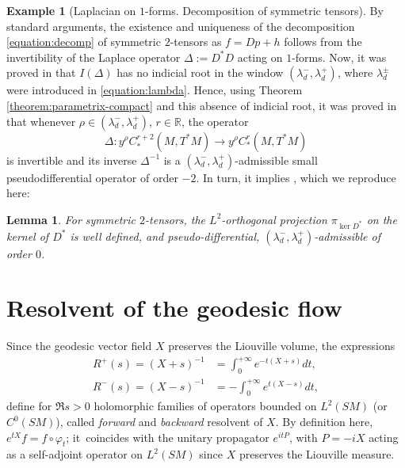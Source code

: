 \documentclass[JEP,XML,SOM,Unicode,NoFloatCountersInSection]{cedram}
\newcommand{\R}{\mathbb{R}}
\theoremstyle{plain}
\newtheorem{lemma}{Lemma}[section]
\theoremstyle{definition}
\newtheorem{example}{Example}[section]
\begin{document}
\begin{example}[Laplacian on $1$-forms. Decomposition of symmetric tensors]
\label{example:dec}
By standard arguments, the existence and uniqueness of the decomposition \eqref{equation:decomp} of symmetric $2$-tensors as $f = Dp + h$ follows from the invertibility of the Laplace operator $\Delta := D^*D$ acting on $1$-forms. Now, it was proved in \cite[Lem.\,5.4]{Bonthonneau-Lefeuvre-19-1} that $I(\Delta)$ has no indicial root in the window $(\lambda_d^-, \lambda_d^+)$, where $\lambda_d^\pm$ were introduced in \eqref{equation:lambda}. Hence, using Theorem \ref{theorem:parametrix-compact} and this absence of indicial root, it was proved in \cite[Lem.\,5.4]{Bonthonneau-Lefeuvre-19-1} that whenever $\rho \in (\lambda_d^-, \lambda_d^+)$, $r \in \R$, the operator
\[
\Delta : y^\rho C^{r+2}_*(M,T^*M) \to y^\rho C^r_*(M,T^*M)
\]
is invertible and its inverse $\Delta^{-1}$ is a $(\lambda_d^-,\lambda_d^+)$-admissible small pseudodifferential operator of order $-2$. In turn, it implies \cite[Lem.\,5.5]{Bonthonneau-Lefeuvre-19-1}, which we reproduce here:
\begin{lemma}
\label{lemma:proj-ker-D^ast-admissible}
For symmetric $2$-tensors, the $L^2$-orthogonal projection $\pi_{\ker D^\ast}$ on the kernel of $D^\ast$ is well defined, and pseudo-differential, $(\lambda_d^-, \lambda_d^+)$-admissible of order $0$.
\end{lemma}
\end{example}

\section{Resolvent of the geodesic flow}
\label{sec:resolvent}

Since the geodesic vector field $X$ preserves the Liouville volume, the expressions
\begin{equation}
\label{equation:resolvent}
\begin{split}
R^+(s) = (X+s)^{-1} &= \int_0^{+\infty} e^{-t(X + s)} dt,\\
R^-(s) = (X-s)^{-1} &= - \int_0^{+\infty} e^{t (X-s)} dt,
\end{split}
\end{equation}
define for $\Re s \!>\!0$ holomorphic families of operators bounded on $L^2(SM)$ (or~$C^0(SM)$), called \emph{forward} and \emph{backward} resolvent of $X$. {\color{black}By definition here, $e^{tX}f = f\circ \varphi_t$; it~coincides with the unitary propagator $e^{i t P}$, with $P = -iX$ acting as a self-adjoint operator on $L^2(SM)$ since $X$ preserves the Liouville measure.}
\end{document}
